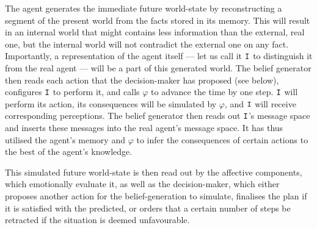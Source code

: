 %
%
%

The agent generates the immediate future world-state by reconstructing a segment of the present world from the facts stored in its memory. This will result in an internal world that might contains less information than the external, real one, but the internal world will not contradict the external one on any fact. Importantly, a representation of the agent itself --- let us call it $\mathtt{I}$ to distinguish it from the real agent --- will be a part of this generated world. The belief generator then reads each action that the decision-maker has proposed (see below), configures $\mathtt{I}$ to perform it, and calls $\varphi$ to advance the time by one step. $\mathtt{I}$ will perform its action, its consequences will be simulated by $\varphi$, and $\mathtt{I}$ will receive corresponding perceptions. The belief generator then reads out $\mathtt{I}$'s message space and inserts these messages into the real agent's message space. It has thus utilised the agent's memory and $\varphi$ to infer the consequences of certain actions to the best of the agent's knowledge.

This simulated future world-state is then read out by the affective components, which emotionally evaluate it, as well as the decision-maker, which either proposes another action for the belief-generation to simulate, finalises the plan if it is satisfied with the predicted, or orders that a certain number of steps be retracted if the situation is deemed unfavourable. 

